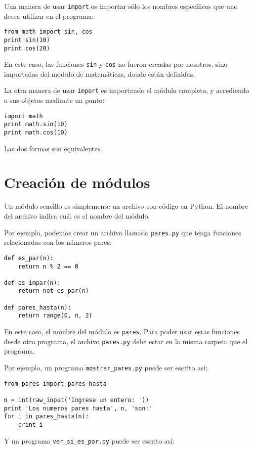 Una manera de usar \lstinline!import! es importar sólo los nombres
específicos que uno desea utilizar en el programa:

\begin{lstlisting}
from math import sin, cos
print sin(10)
print cos(20)
\end{lstlisting}

En este caso, las funciones \lstinline!sin! y \lstinline!cos! no fueron
creadas por nosotros, sino importadas del módulo de matemáticas, donde
están definidas.

La otra manera de usar \lstinline!import! es importando el módulo
completo, y accediendo a sus objetos mediante un punto:

\begin{lstlisting}
import math
print math.sin(10)
print math.cos(10)
\end{lstlisting}

Las dos formas son equivalentes.

\section{Creación de módulos}

Un módulo sencillo es simplemente un archivo con código en Python. El
nombre del archivo indica cuál es el nombre del módulo.

Por ejemplo, podemos crear un archivo llamado \lstinline!pares.py! que
tenga funciones relacionadas con los números pares:

\begin{lstlisting}
def es_par(n):
    return n % 2 == 0

def es_impar(n):
    return not es_par(n)

def pares_hasta(n):
    return range(0, n, 2)
\end{lstlisting}

En este caso, el nombre del módulo es \lstinline!pares!. Para poder usar
estas funciones desde otro programa, el archivo \lstinline!pares.py!
debe estar en la misma carpeta que el programa.

Por ejemplo, un programa \lstinline!mostrar_pares.py! puede ser escrito así:
%
\begin{lstlisting}
from pares import pares_hasta

n = int(raw_input('Ingrese un entero: '))
print 'Los numeros pares hasta', n, 'son:'
for i in pares_hasta(n):
    print i
\end{lstlisting}
%
Y un programa \lstinline!ver_si_es_par.py! puede ser escrito así:

